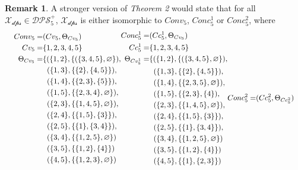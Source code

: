 \documentclass[11pt, oneside]{article}      %
\theoremstyle{definition}
\numberwithin{equation}{section}
\newtheorem*{remark}{Remark}
\newcommand*{\Scale}[2][4]{\scalebox{#1}{$#2$}}%
\theoremstyle{c}
\begin{document}
\begin{remark}
A stronger version of \textit{Theorem 2} would state that for all $\mathscr{X_{dps}} \in \mathscr{DPS}^+_5$, $\mathscr{X_{dps}}$ is either isomorphic to $Conv_5$, $Conc_5^1$ or $Conc_5^2$, where
\begin{gather}\label{stronger-theorem-2}
\Scale[0.9]{
\begin{split}
    Conv_5 = &(Cv_5, \Theta_{Cv_5}) \\
    Cv_5 = &\{1,2,3,4,5\} \\
    \Theta_{Cv_5} = & \{(\{1,2\},\{(\{3,4,5\},\varnothing\}), \\
    &\;\; (\{1,3\},\{\{2\},\{4,5\}\}), \\
    &\;\; (\{1,4\},\{\{2,3\},\{5\}\}), \\
    &\;\; (\{1,5\},\{\{2,3,4\},\varnothing\}), \\
    &\;\; (\{2,3\},\{\{1,4,5\},\varnothing\}), \\
    &\;\; (\{2,4\},\{\{1,5\},\{3\}\}), \\
    &\;\; (\{2,5\},\{\{1\},\{3,4\}\}), \\
    &\;\; (\{3,4\}, \{\{1,2,5\},\varnothing\}) \\
    &\;\; (\{3,5\}, \{\{1,2\},\{4\}\}) \\
    &\;\; (\{4,5\}, \{\{1,2,3\},\varnothing\})
 \end{split}
\begin{split}
    Conc_5^1 = &(Cc_5^1, \Theta_{Cv_5}) \\
    Cc_5^1 = &\{1,2,3,4,5\} \\
    \Theta_{Cv_5^1} = & \{(\{1,2\},\{(\{3,4,5\},\varnothing\}), \\
    &\;\; (\{1,3\},\{\{2\},\{4,5\}\}), \\
    &\;\; (\{1,4\},\{\{2,3,5\},\varnothing\}), \\
    &\;\; (\{1,5\},\{\{2,3\},\{4\}), \\
    &\;\; (\{2,3\},\{\{1,4,5\},\varnothing\}), \\
    &\;\; (\{2,4\},\{\{1,5\},\{3\}\}), \\
    &\;\; (\{2,5\},\{\{1\},\{3,4\}\}), \\
    &\;\; (\{3,4\}, \{\{1,2,5\},\varnothing\}) \\
    &\;\; (\{3,5\}, \{\{1,2\},\{4\}\}) \\
    &\;\; (\{4,5\}, \{\{1\},\{2,3\}\})
 \end{split}
 \begin{split}
    Conc_5^2  = &(Cc_5^2, \Theta_{Cc_5^2}) \\

\end{split}}
\end{gather}
\end{remark}
\end{document}
